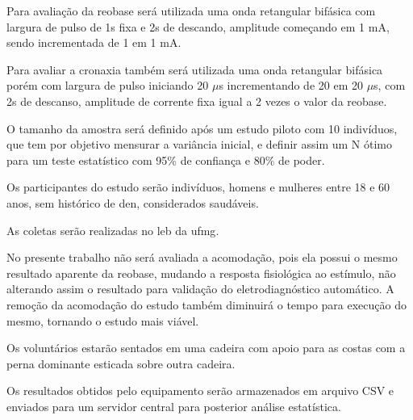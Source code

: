 Para avaliação da reobase será utilizada uma onda retangular bifásica com largura de pulso de 1s fixa e 2s de descando, amplitude começando em 1 mA, sendo incrementada de 1 em 1 mA.

Para avaliar a cronaxia também será utilizada uma onda retangular bifásica porém com largura de pulso iniciando 20 $\mu$s incrementando de 20 em 20 $\mu$s, com 2s de descanso, amplitude de corrente fixa igual a 2 vezes o valor da reobase.

O tamanho da amostra será definido após um estudo piloto com 10 indivíduos, que tem por objetivo mensurar a variância inicial, e definir assim um N ótimo para um teste estatístico com 95\% de confiança e 80\% de poder.

Os participantes do estudo serão indivíduos, homens e mulheres entre 18 e 60 anos, sem histórico de \ac{den}, considerados saudáveis.

As coletas serão realizadas no \ac{leb} da \ac{ufmg}.

No presente trabalho não será avaliada a acomodação, pois ela possui o mesmo resultado aparente da reobase, mudando a resposta fisiológica ao estímulo, não alterando assim o resultado para validação do eletrodiagnóstico automático. A remoção da acomodação do estudo também diminuirá o tempo para execução do mesmo, tornando o estudo mais viável.

Os voluntários estarão sentados em uma cadeira com apoio para as costas com a perna dominante esticada sobre outra cadeira.

Os resultados obtidos pelo equipamento serão armazenados em arquivo CSV e enviados para um servidor central para posterior análise estatística.



